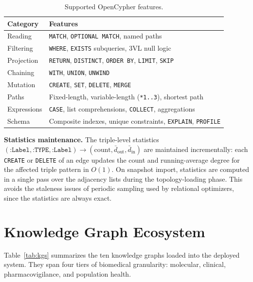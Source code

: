 \documentclass[runningheads]{llncs}
\begin{document}
\begin{table}[t]
\centering
\caption{Supported OpenCypher features.}
\label{tab:cypher}
\small
\begin{tabular}{@{}ll@{}}
\toprule
\textbf{Category} & \textbf{Features} \\
\midrule
Reading    & \texttt{MATCH}, \texttt{OPTIONAL MATCH}, named paths \\
Filtering  & \texttt{WHERE}, \texttt{EXISTS} subqueries, 3VL null logic \\
Projection & \texttt{RETURN}, \texttt{DISTINCT}, \texttt{ORDER BY}, \texttt{LIMIT}, \texttt{SKIP} \\
Chaining   & \texttt{WITH}, \texttt{UNION}, \texttt{UNWIND} \\
Mutation   & \texttt{CREATE}, \texttt{SET}, \texttt{DELETE}, \texttt{MERGE} \\
Paths      & Fixed-length, variable-length (\texttt{*1..3}), shortest path \\
Expressions & \texttt{CASE}, list comprehensions, \texttt{COLLECT}, aggregations \\
Schema     & Composite indexes, unique constraints, \texttt{EXPLAIN}, \texttt{PROFILE} \\
\bottomrule
\end{tabular}
\end{table}

\noindent\textbf{Statistics maintenance.}
The triple-level statistics
$(\texttt{:Label}, \texttt{:TYPE}, \texttt{:Label}) \to
(\text{count}, \bar{d}_{\text{out}}, \bar{d}_{\text{in}})$
are maintained incrementally: each \texttt{CREATE} or \texttt{DELETE}
of an edge updates the count and running-average degree for the
affected triple pattern in $O(1)$.  On snapshot import, statistics
are computed in a single pass over the adjacency lists during
the topology-loading phase.  This avoids the staleness issues of
periodic sampling used by relational optimizers, since the
statistics are always exact.

\section{Knowledge Graph Ecosystem}\label{sec:kgs}

Table~\ref{tab:kgs} summarizes the ten knowledge graphs loaded
into the deployed system.  They span four tiers of biomedical
granularity: molecular, clinical, pharmacovigilance, and population
health.
\end{document}
